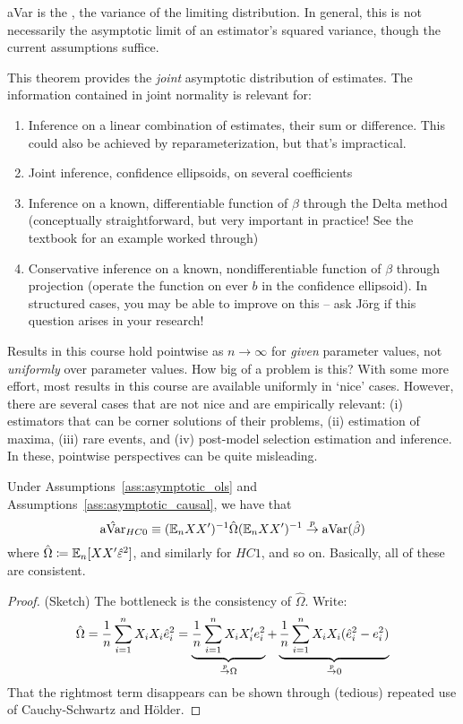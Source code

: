 \documentclass[10pt]{article}
\begin{document}
\begin{definition}
	aVar is the , the variance of the limiting distribution. In general, this is not necessarily the asymptotic limit of an estimator's squared variance, though the current assumptions suffice.
\end{definition}

\begin{remark}
	This theorem provides the \emph{joint} asymptotic distribution of estimates. The information contained in joint normality is relevant for:
	\begin{enumerate}
		\item Inference on a linear combination of estimates, \eg their sum or difference. This could also be achieved by reparameterization, but that's impractical.
		\item Joint inference, \ie confidence ellipsoids, on several coefficients
		\item Inference on a known, differentiable function of $\beta$ through the Delta method (conceptually straightforward, but very important in practice! See the textbook for an example worked through)
		\item Conservative inference on a known, nondifferentiable function of $\beta$ through projection (\ie operate the function on ever $b$ in the confidence ellipsoid). In structured cases, you may be able to improve on this -- ask J\"{o}rg if this question arises in your research!
	\end{enumerate}
\end{remark}

\begin{remark}
	Results in this course hold pointwise as $n \to \infty$ for \emph{given} parameter values, not \emph{uniformly} over parameter values. How big of a problem is this? With some more effort, most results in this course are available uniformly in `nice' cases. However, there are several cases that are not nice and are empirically relevant: (i) estimators that can be corner solutions of their problems, (ii) estimation of maxima, (iii) rare events, and (iv) post-model selection estimation and inference. In these, pointwise perspectives can be quite misleading. 
\end{remark}

\begin{theorem}
	Under Assumptions~\ref{ass:asymptotic_ols} and Assumptions~\ref{ass:asymptotic_causal}, we have that \[\hat{\mathop{\rm aVar}}_{HC0} \equiv (\mathbb{E}_n XX')^{-1} \hat{\Omega} (\mathbb{E}_n XX')^{-1} \overset{p}{\to} \mathop{\rm aVar}(\hat{\beta})\]where $\hat{\Omega} \coloneqq \mathbb{E}_n[XX'\hat{\varepsilon}^2]$, and similarly for $HC1$, and so on. Basically, all of these are consistent.
\end{theorem}
\begin{proof}
	(Sketch) The bottleneck is the consistency of $\hat{\Omega}$. Write: \[\hat{\Omega} = \frac{1}{n}\sum_{i=1}^n X_i X_i \hat{e}_i^2 = \underbrace{\frac{1}{n}\sum_{i=1}^n X_i X_i' e_i^2}_{\overset{p}{\to} \Omega} + \underbrace{\frac{1}{n}\sum_{i=1}^n X_i X_i (\hat{e}_i^2 - e_i^2)}_{\overset{p}{\to} 0}\]That the rightmost term disappears can be shown through (tedious) repeated use of Cauchy-Schwartz and H\"{o}lder.
\end{proof}
\end{document}
